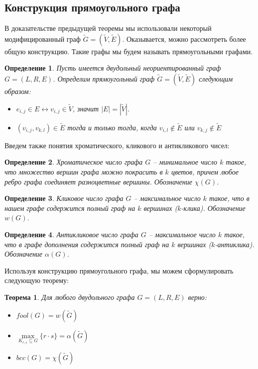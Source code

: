 \documentclass[a4paper]{article}
\newtheorem*{mdefinition}{Определение}
\newtheorem*{mtheorem}{Теорема}
\begin{document}
\subsection{Конструкция прямоугольного графа}

В доказательстве предыдущей теоремы мы использовали некоторый модифицированный граф $\widetilde{G} = 
(\widetilde{V}, \widetilde{E})$. Оказывается, можно рассмотреть более общую конструкцию. Такие графы 
мы будем называть прямоугольными графами.
\begin{mdefinition}
    Пусть имеется двудольный неориентированный граф $G = (L, R, E)$. Определим прямоугольный граф 
    $\widetilde{G} = (\widetilde{V}, \widetilde{E})$ следующим образом:
    \begin{itemize}[noitemsep]
        \item $e_{i,j}\in E \leftrightarrow v_{i,j}\in \widetilde{V}$, значит $|E| = |\widetilde{V}|$.
        \item $(v_{i,j}, v_{k, l}) \in \widetilde{E}$ тогда и только тогда, когда $v_{i,l}\notin \widetilde{E}$ 
        или $v_{k,j}\notin\widetilde{E}$
    \end{itemize}
\end{mdefinition}

Введем также понятия хроматического, кликового и антикликового чисел:
\begin{mdefinition}

    Хроматическое число графа $G$ -- минимальное число $k$ такое, что множество вершин графа можно 
    покрасить в $k$ цветов, причем любое ребро графа соединяет разноцветные вершины. Обозначение $\chi(G)$.
\end{mdefinition}
\begin{mdefinition} 
    Кликовое число графа $G$ -- максимальное число $k$ такое, что в нашем графе содержится полный 
    граф на $k$ вершинах ($k$-клика). Обозначение $w(G)$.
\end{mdefinition}
\begin{mdefinition} 
    Антикликовое число графа $G$ -- максимальное число $k$ такое, что в графе дополнения содержится 
    полный граф на $k$ вершинах ($k$-антиклика). Обозначение $\alpha(G)$.
\end{mdefinition}


Используя конструкцию прямоугольного графа, мы можем сформулировать следующую теорему:
\begin{mtheorem}
    Для любого двудольного графа $G = (L, R, E)$ верно:
    \begin{itemize}[noitemsep]
        \item[1)] $fool(G) = w(\widetilde{G})$
        \item[2)] $\max\limits_{K_{r,s}\subseteq G}\{r\cdot s\} = \alpha(\widetilde{G})$
        \item[3)] $bcc(G) = \chi(\widetilde{G})$
    \end{itemize}
\end{mtheorem}
\end{document}
